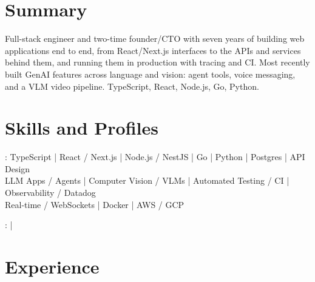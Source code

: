 \documentclass[print]{jack-resume}
\begin{document}
\pagecolor{darkmodeBackground}


\begin{minipage}[t][1cm][t]{.03\textwidth}
    \hfill
\end{minipage}

\section{Summary}
Full-stack engineer and two-time founder/CTO with seven years of building web applications end to end, from React/Next.js interfaces to the APIs and services behind them, and running them in production with tracing and CI. Most recently built GenAI features across language and vision: agent tools, voice messaging, and a VLM video pipeline. TypeScript, React, Node.js, Go, Python.
\sectionsep

\section{Skills and Profiles}
:
TypeScript \hfill | \hfill
React / Next.js \hfill | \hfill
Node.js / NestJS \hfill | \hfill
Go \hfill | \hfill
Python \hfill | \hfill
Postgres \hfill | \hfill
API Design \\
\hspace{1.0cm} LLM Apps / Agents \hfill | \hfill
Computer Vision / VLMs \hfill | \hfill
Automated Testing / CI \hfill | \hfill
Observability / Datadog \\
\hspace{1.0cm} Real-time / WebSockets \hfill | \hfill
Docker \hfill | \hfill
AWS / GCP \\

\raggedright{
    :
      \href{https://www.linkedin.com/in/jack-sturtevant/}{ \ExternalLink} |
     \href{https://github.com/jacksturt}{ \ExternalLink}}

\section{Experience}
\end{document}
